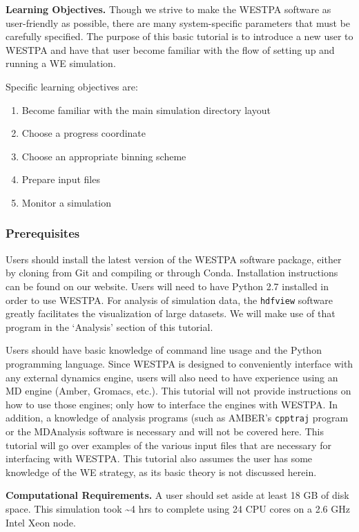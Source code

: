 \documentclass[9pt,tutorial]{livecoms}
\begin{document}
\textbf{Learning Objectives.} Though we strive to make the WESTPA software as user-friendly as possible, there are many system-specific parameters that must be carefully specified. 
The purpose of this basic tutorial is to introduce a new user to WESTPA and have that user become familiar with the flow of setting up and running a WE simulation.   

Specific learning objectives are:
\begin{enumerate}
\item Become familiar with the main simulation directory layout
\item Choose a progress coordinate
\item Choose an appropriate binning scheme
\item Prepare input files
\item Monitor a simulation
\end{enumerate}

\subsubsection{Prerequisites}

Users should install the latest version of the WESTPA software package, either by cloning from Git and compiling or through Conda. 
Installation instructions can be found on our website. 
Users will need to have Python 2.7 installed in order to use WESTPA. 
For analysis of simulation data, the \verb|hdfview| software greatly facilitates the visualization of large datasets. 
We will make use of that program in the ‘Analysis’ section of this tutorial.

Users should have basic knowledge of command line usage and the Python programming language. 
Since WESTPA is designed to conveniently interface with any external dynamics engine, users will also need to have experience using an MD engine (Amber, Gromacs, etc.). 
This tutorial will not provide instructions on how to use those engines; only how to interface the engines with WESTPA. 
In addition, a knowledge of analysis programs (such as AMBER’s \verb|cpptraj| program or the MDAnalysis software is necessary and will not be covered here. 
This tutorial will go over examples of the various input files that are necessary for interfacing with WESTPA. 
This tutorial also assumes the user has some knowledge of the WE strategy, as its basic theory is not discussed herein.

\textbf{Computational Requirements.} A user should set aside at least 18 GB of disk space. 
This simulation took \textasciitilde 4 hrs to complete using 24 CPU cores on a 2.6 GHz Intel Xeon node.
\end{document}
